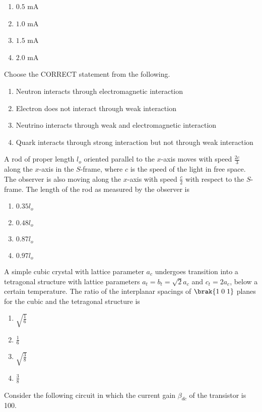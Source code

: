 \begin{enumerate}
    \item $0.5$ mA
    \item $1.0$ mA
    \item $1.5$ mA
    \item $2.0$ mA
\end{enumerate}
\item Choose the CORRECT statement from the following.
\begin{enumerate}
    \item Neutron interacts through electromagnetic interaction
    \item Electron does not interact through weak interaction
    \item Neutrino interacts through weak and electromagnetic interaction
    \item Quark interacts through strong interaction but not through weak interaction
\end{enumerate}
\item A rod of proper length $l_o$ oriented parallel to the $x$-axis moves with speed $\frac{2c}{3}$ along the $x$-axis in the $S$-frame, where $c$ is the speed of the light in free space. The observer is also moving along the $x$-axis with speed $\frac{c}{2}$ with respect to the $S$-frame. The length of the rod as measured by the observer is
\begin{enumerate}
    \item $0.35l_o$
    \item $0.48l_o$
    \item $0.87l_o$
    \item $0.97l_o$
\end{enumerate}
\item A simple cubic crystal with lattice parameter $a_c$ undergoes transition into a tetragonal structure with lattice parameters $a_t=b_t=\sqrt{2}a_c$ and $c_t=2a_c$, below a certain temperature. The ratio of the interplanar spacings of $\brak{1 \; 0 \; 1}$ planes for the cubic and the tetragonal structure is
\begin{enumerate}
    \item $\sqrt{\frac{1}{6}}$
    \item $\frac{1}{6}$
    \item $\sqrt{\frac{3}{8}}$
    \item $\frac{3}{8}$
\end{enumerate}
\item Consider the following circuit in which the current gain $\beta_{dc}$ of the transistor is 100.
